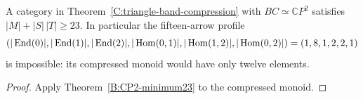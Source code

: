 \begin{corollary}\label{C:triangle-band-CP2-size}
A category in Theorem~\ref{C:triangle-band-compression} with
$BC\simeq\mathbb CP^2$ satisfies $|M|+|S|\,|T|\geq23$.
In particular the fifteen-arrow profile
\[
 (|\operatorname{End}(0)|,|\operatorname{End}(1)|,|\operatorname{End}(2)|,
   |\operatorname{Hom}(0,1)|,|\operatorname{Hom}(1,2)|,|\operatorname{Hom}(0,2)|)
       =(1,8,1,2,2,1)
\]
is impossible: its compressed monoid would have only twelve
elements.
\end{corollary}
\begin{proof}
Apply Theorem~\ref{B:CP2-minimum23} to the compressed monoid.
\end{proof}
